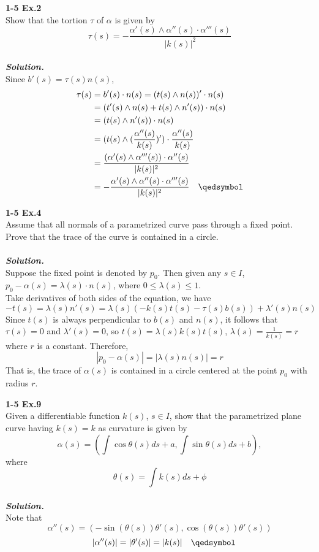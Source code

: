 \documentclass{article}
\begin{document}
\par
\textbf{1-5 Ex.2}\\
Show that the tortion $\tau$ of $\alpha$ is given by
$$
    \tau(s) = - \frac{\alpha'(s) \wedge \alpha''(s) \cdot \alpha'''(s)}{|k(s)|^2}
$$
\\
\textbf{\textit{Solution.}}\\
Since $b'(s) = \tau(s) n(s)$,
$$
\begin{aligned}
    \tau(s) &= b'(s) \cdot n(s) = (t(s) \wedge n(s))' \cdot n(s) \\
    &= (t'(s) \wedge n(s) + t(s) \wedge n'(s)) \cdot n(s) \\
    &= (t(s) \wedge n'(s)) \cdot n(s) \\
    &= (t(s) \wedge (\frac{\alpha''(s)}{k(s)})') \cdot \frac{\alpha''(s)}{k(s)}\\
    &= \frac{(\alpha'(s) \wedge \alpha'''(s)) \cdot \alpha''(s)}{|k(s)|^2} \\
    &= -\frac{\alpha'(s) \wedge \alpha''(s) \cdot \alpha'''(s)}{|k(s)|^2} \quad \qedsymbol
\end{aligned}
$$
\par
\textbf{1-5 Ex.4}\\
Assume that all normals of a parametrized curve pass through a fixed point. Prove that
the trace of the curve is contained in a circle.\\\\
\textbf{\textit{Solution.}}\\
Suppose the fixed point is denoted by $p_0$. Then given any $s \in I$, $p_0 - \alpha(s) = \lambda(s) \cdot n(s)$, where $0 \leq \lambda(s) \leq 1$.\\
Take derivatives of both sides of the equation, we have
$$
    -t(s) = \lambda(s) n'(s) = \lambda(s) (-k(s)t(s) - \tau(s)b(s)) + \lambda'(s)n(s)
$$
Since $t(s)$ is always perpendicular to $b(s)$ and $n(s)$, it follows that $\tau(s)=0$ and $\lambda'(s)=0$, so $t(s) = \lambda(s) k(s)t(s)$, $\lambda(s) = \frac{1}{k(s)} = r$
where $r$ is a constant.
Therefore, 
$$
    |p_0 - \alpha(s)| = |\lambda(s)n(s)| = r
$$
That is, the trace of $\alpha(s)$ is contained in a circle centered at the point $p_0$ with radius $r$.

\par
\textbf{1-5 Ex.9}\\
Given a differentiable function $k(s)$, $s \in I$, show that the parametrized plane curve having $k(s) = k$
as curvature is given by
$$
    \alpha(s) = (\int \cos \theta(s)ds + a, \int \sin \theta(s)ds + b),
$$
where
$$
    \theta(s) = \int k(s)ds + \phi
$$
\\
\textbf{\textit{Solution.}}\\
Note that
$$
    \alpha''(s) = (-\sin{(\theta(s))} \theta'(s), \cos{(\theta(s))}\theta'(s))
$$
$$
    \quad |\alpha''(s)| = |\theta'(s)| = |k(s)| \quad \qedsymbol
$$
\end{document}

